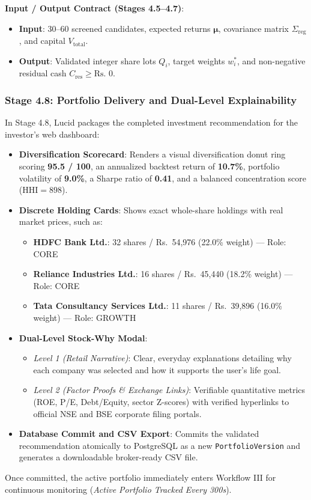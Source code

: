 \noindent \textbf{Input / Output Contract (Stages 4.5--4.7)}:
\begin{itemize}
    \item \textbf{Input}: 30--60 screened candidates, expected returns $\boldsymbol{\mu}$, covariance matrix $\Sigma_{\text{reg}}$, and capital $V_{\text{total}}$.
    \item \textbf{Output}: Validated integer share lots $Q_i$, target weights $w_i^*$, and non-negative residual cash $C_{\text{res}} \ge \text{Rs.~}0$.
\end{itemize}

\subsubsection{Stage 4.8: Portfolio Delivery and Dual-Level Explainability}
In Stage 4.8, Lucid packages the completed investment recommendation for the investor's web dashboard:
\begin{itemize}
    \item \textbf{Diversification Scorecard}: Renders a visual diversification donut ring scoring \textbf{95.5 / 100}, an annualized backtest return of \textbf{10.7\%}, portfolio volatility of \textbf{9.0\%}, a Sharpe ratio of \textbf{0.41}, and a balanced concentration score ($\text{HHI} = 898$).
    \item \textbf{Discrete Holding Cards}: Shows exact whole-share holdings with real market prices, such as:
    \begin{itemize}
        \item \textbf{HDFC Bank Ltd.}: 32 shares / Rs.~54,976 (22.0\% weight) --- Role: CORE
        \item \textbf{Reliance Industries Ltd.}: 16 shares / Rs.~45,440 (18.2\% weight) --- Role: CORE
        \item \textbf{Tata Consultancy Services Ltd.}: 11 shares / Rs.~39,896 (16.0\% weight) --- Role: GROWTH
    \end{itemize}
    \item \textbf{Dual-Level Stock-Why Modal}:
    \begin{itemize}
        \item \textit{Level 1 (Retail Narrative)}: Clear, everyday explanations detailing why each company was selected and how it supports the user's life goal.
        \item \textit{Level 2 (Factor Proofs \& Exchange Links)}: Verifiable quantitative metrics (ROE, P/E, Debt/Equity, sector Z-scores) with verified hyperlinks to official NSE and BSE corporate filing portals.
    \end{itemize}
    \item \textbf{Database Commit and CSV Export}: Commits the validated recommendation atomically to PostgreSQL as a new \texttt{PortfolioVersion} and generates a downloadable broker-ready CSV file.
\end{itemize}
Once committed, the active portfolio immediately enters Workflow III for continuous monitoring (\textit{Active Portfolio Tracked Every 300s}).

